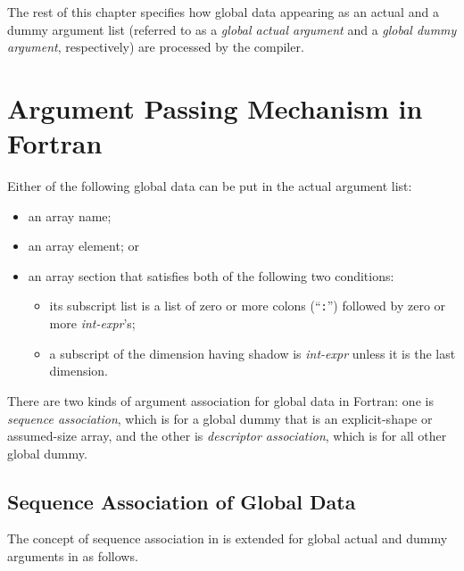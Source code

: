 \vspace{1.5zw}

\hspace{-1.2\parindent}
The rest of this chapter specifies how global data appearing as an
actual and a dummy argument list (referred to as a {\it global actual
argument} and a {\it global dummy argument}, respectively) are processed
by the {\XMP} compiler.


\section{Argument Passing Mechanism in {\XMP} Fortran}


Either of the following global data can be put in the actual argument list:

\begin{itemize}
 \item an array name;
 \item an array element; or
 \item an array section that satisfies both of the following two
       conditions:
       \begin{itemize}
	\item its subscript list is a list of zero or more colons
	      (``{\tt :}'') followed by zero or more {\it int-expr}'s;
	\item a subscript of the dimension having shadow is {\it
	      int-expr} unless it is the last dimension.
       \end{itemize}
\end{itemize}

There are two kinds of argument association for global data in {\XMP}
Fortran: one is {\it sequence association}, which is for a global dummy
that is an explicit-shape or assumed-size array, and the other is
{\it descriptor association}, which is for all other global dummy.


\subsection{Sequence Association of Global Data}

The concept of sequence association in {\Fort} is extended for global
actual and dummy arguments in {\XMP} as follows.

